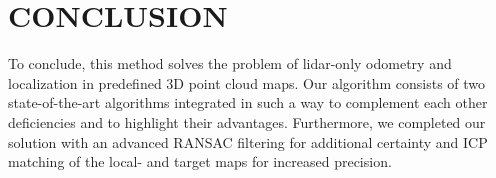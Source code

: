 \documentclass[letterpaper, 10 pt, conference]{ieeeconf}  %
\begin{document}
\section{CONCLUSION} \label{conclusion}
To conclude, this method solves the problem of lidar-only odometry and localization in predefined 3D point cloud maps. Our algorithm consists of two state-of-the-art algorithms integrated in such a way to complement each other deficiencies and to highlight their advantages. Furthermore, we completed our solution with an advanced RANSAC filtering for additional certainty and ICP matching of the local- and target maps for increased precision.

\addtolength{\textheight}{-8cm}   %










\end{document}
